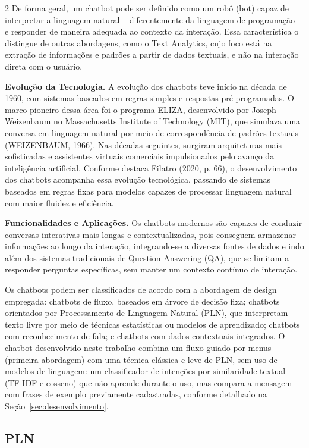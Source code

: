 \documentclass[10pt]{article}
\begin{document}
\begin{multicols}{2}
De forma geral, um chatbot pode ser definido como um robô (bot) capaz de
interpretar a linguagem natural -- diferentemente da linguagem de
programação -- e responder de maneira adequada ao contexto da interação.
Essa característica o distingue de outras abordagens, como o Text
Analytics, cujo foco está na extração de informações e padrões a partir
de dados textuais, e não na interação direta com o usuário.

\textbf{Evolução da Tecnologia.} A evolução dos chatbots teve início na
década de 1960, com sistemas baseados em regras simples e respostas
pré-programadas. O marco pioneiro dessa área foi o programa ELIZA,
desenvolvido por Joseph Weizenbaum no Massachusetts Institute of
Technology (MIT), que simulava uma conversa em linguagem natural por meio
de correspondência de padrões textuais (WEIZENBAUM, 1966). Nas décadas
seguintes, surgiram arquiteturas mais sofisticadas e assistentes virtuais
comerciais impulsionados pelo avanço da inteligência artificial. Conforme
destaca Filatro (2020, p. 66), o desenvolvimento dos chatbots acompanha
essa evolução tecnológica, passando de sistemas baseados em regras fixas
para modelos capazes de processar linguagem natural com maior fluidez e
eficiência.

\textbf{Funcionalidades e Aplicações.} Os chatbots modernos são capazes de
conduzir conversas interativas mais longas e contextualizadas, pois
conseguem armazenar informações ao longo da interação, integrando-se a
diversas fontes de dados e indo além dos sistemas tradicionais de
Question Answering (QA), que se limitam a responder perguntas
específicas, sem manter um contexto contínuo de interação.

Os chatbots podem ser classificados de acordo com a abordagem de design
empregada: chatbots de fluxo, baseados em árvore de decisão fixa;
chatbots orientados por Processamento de Linguagem Natural (PLN), que
interpretam texto livre por meio de técnicas estatísticas ou modelos de
aprendizado; chatbots com reconhecimento de fala; e chatbots com dados
contextuais integrados. O chatbot desenvolvido neste trabalho combina um
fluxo guiado por menus (primeira abordagem) com uma técnica clássica e
leve de PLN, sem uso de modelos de linguagem: um classificador de
intenções por similaridade textual (TF-IDF e cosseno) que não aprende
durante o uso, mas compara a mensagem com frases de exemplo previamente
cadastradas, conforme detalhado na Seção~\ref{sec:desenvolvimento}.

\subsection{PLN}\label{sec:pln}


\end{multicols}
\end{document}
